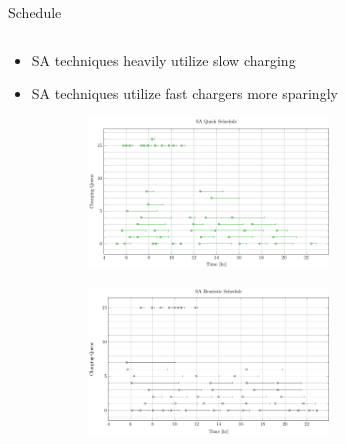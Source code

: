 \documentclass[aspectratio=169]{beamer}
\begin{document}
\begin{frame}[label={sec:org352f467}]{Schedule}
\begin{columns}
\begin{column}{0.5\columnwidth}
{\scriptsize
\begin{itemize}
\item SA techniques heavily utilize slow charging
\item SA techniques utilize fast chargers more sparingly
\end{itemize}
}

\begin{figure}
\begin{subfigure}[t]{\textwidth}
\centering
    \includegraphics[width=0.7\textwidth]{img/sa-pap-paper-good/schedule-sa-quick}
\end{subfigure}
\begin{subfigure}[t]{\textwidth}
\centering
    \includegraphics[width=0.7\textwidth]{img/sa-pap-paper-good/schedule-sa-heuristic}
\end{subfigure}
\end{figure}
\end{column}
\end{columns}
\end{frame}
\end{document}

